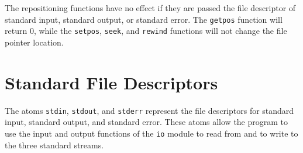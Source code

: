 {\begin{itemize}
\end{itemize}
The repositioning functions have no effect if they are passed the file descriptor of standard input, standard output, or standard error.  The \texttt{getpos} function will return $0$, while the \texttt{setpos}, \texttt{seek}, and \texttt{rewind} functions will not change the file pointer location.
}
\section{Standard File Descriptors}
The atoms \texttt{stdin}, \texttt{stdout}, and \texttt{stderr} represent the file descriptors for standard input, standard output, and standard error.  These atoms allow the program to use the input and output functions of the \texttt{io} module to read from and to write to the three standard streams. 

